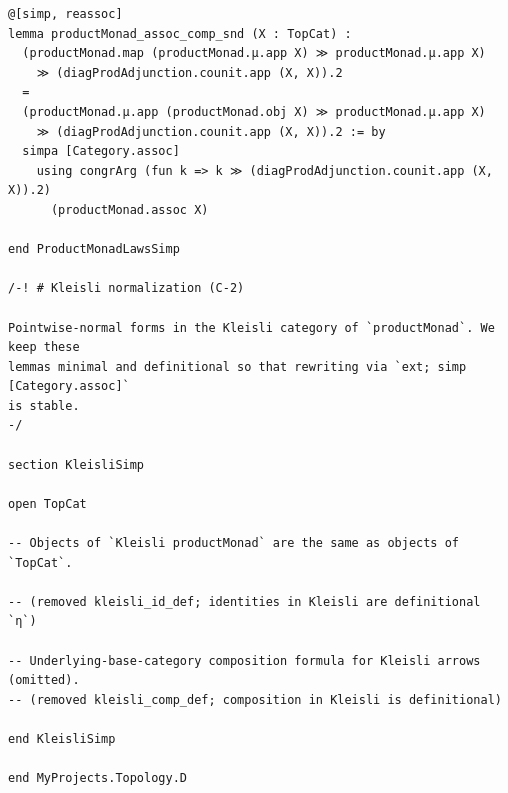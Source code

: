 \documentclass[12pt]{article}
\theoremstyle{definition}
\begin{document}
\begin{lstlisting}
@[simp, reassoc]
lemma productMonad_assoc_comp_snd (X : TopCat) :
  (productMonad.map (productMonad.μ.app X) ≫ productMonad.μ.app X)
    ≫ (diagProdAdjunction.counit.app (X, X)).2
  =
  (productMonad.μ.app (productMonad.obj X) ≫ productMonad.μ.app X)
    ≫ (diagProdAdjunction.counit.app (X, X)).2 := by
  simpa [Category.assoc]
    using congrArg (fun k => k ≫ (diagProdAdjunction.counit.app (X, X)).2)
      (productMonad.assoc X)

end ProductMonadLawsSimp

/-! # Kleisli normalization (C‑2)

Pointwise-normal forms in the Kleisli category of `productMonad`. We keep these
lemmas minimal and definitional so that rewriting via `ext; simp [Category.assoc]`
is stable.
-/

section KleisliSimp

open TopCat

-- Objects of `Kleisli productMonad` are the same as objects of `TopCat`.

-- (removed kleisli_id_def; identities in Kleisli are definitional `η`)

-- Underlying-base-category composition formula for Kleisli arrows (omitted).
-- (removed kleisli_comp_def; composition in Kleisli is definitional)

end KleisliSimp

end MyProjects.Topology.D

\end{lstlisting}
\end{document}
